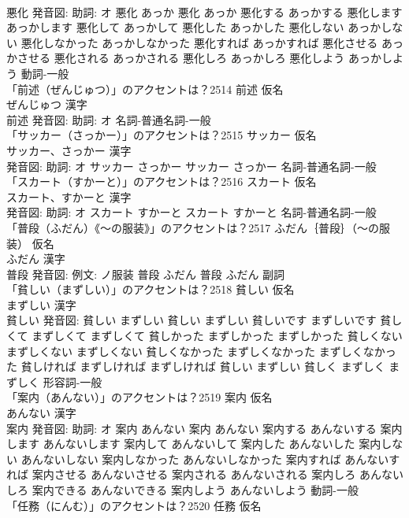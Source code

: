 \documentclass[8pt]{extreport}
\begin{document}
\begin{CJK}{UTF8}{min}
\\	悪化 発音図: 助詞: オ	悪化 あっか		悪化 あっか 悪化する あっかする 悪化します あっかします 悪化して あっかして 悪化した あっかした 悪化しない あっかしない 悪化しなかった あっかしなかった 悪化すれば あっかすれば 悪化させる あっかさせる 悪化される あっかされる 悪化しろ あっかしろ 悪化しよう あっかしよう				動詞-一般 
\\	「前述（ぜんじゅつ）」のアクセントは？2514	前述 仮名　
\\	ぜんじゅつ 漢字　
\\	前述 発音図: 助詞: オ							名詞-普通名詞-一般 
\\	「サッカー（さっかー）」のアクセントは？2515	サッカー 仮名　
\\	サッカー、さっかー 漢字　
\\	発音図: 助詞: オ	サッカー さっかー		サッカー さっかー				名詞-普通名詞-一般 
\\	「スカート（すかーと）」のアクセントは？2516	スカート 仮名　
\\	スカート、すかーと 漢字　
\\	発音図: 助詞: オ	スカート すかーと		スカート すかーと				名詞-普通名詞-一般 
\\	「普段（ふだん）《〜の服装》」のアクセントは？2517	ふだん｛普段｝（〜の服装） 仮名　
\\	ふだん 漢字　
\\	普段 発音図: 例文: ノ服装	普段 ふだん		普段 ふだん				副詞 
\\	「貧しい（まずしい）」のアクセントは？2518	貧しい 仮名　
\\	まずしい 漢字　
\\	貧しい 発音図:	貧しい まずしい		貧しい まずしい 貧しいです まずしいです 貧しくて まずしくて まずしくて 貧しかった まずしかった まずしかった 貧しくない まずしくない まずしくない 貧しくなかった まずしくなかった まずしくなかった 貧しければ まずしければ まずしければ 貧しい まずしい 貧しく まずしく まずしく				形容詞-一般 
\\	「案内（あんない）」のアクセントは？2519	案内 仮名　
\\	あんない 漢字　
\\	案内 発音図: 助詞: オ	案内 あんない		案内 あんない 案内する あんないする 案内します あんないします 案内して あんないして 案内した あんないした 案内しない あんないしない 案内しなかった あんないしなかった 案内すれば あんないすれば 案内させる あんないさせる 案内される あんないされる 案内しろ あんないしろ 案内できる あんないできる 案内しよう あんないしよう				動詞-一般 
\\	「任務（にんむ）」のアクセントは？2520	任務 仮名　

\end{CJK}
\end{document}
